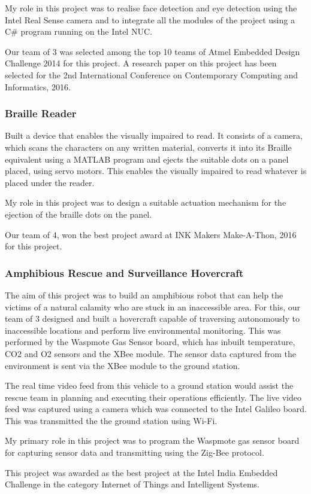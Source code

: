 \documentclass{article}
\begin{document}
My role in this project was to realise face detection and eye detection using the Intel Real Sense camera and to integrate all the modules of the project using a C\# program running on the Intel NUC.

Our team of 3 was selected among the top 10 teams of Atmel Embedded Design Challenge 2014 for this project. A research paper on this project has been selected for the 2nd International Conference on Contemporary Computing and Informatics, 2016.

\subsubsection{Braille Reader}

Built a device that enables the visually impaired to read. It consists of a camera, which scans the characters on any written material, converts it into its Braille equivalent using a MATLAB program and ejects the suitable dots on a panel placed, using servo motors. This enables the visually impaired to read whatever is placed under the reader.

My role in this project was to design a suitable actuation mechanism for the ejection of the braille dots on the panel.

Our team of 4, won the best project award at INK Makers Make-A-Thon, 2016 for this project.

\subsubsection{Amphibious Rescue and Surveillance Hovercraft}

The aim of this project was to build an amphibious robot that can help the victims of a natural calamity who are stuck in an inaccessible area. For this, our team of 3 designed and built a hovercraft capable of traversing autonomously to inaccessible locations and perform live environmental monitoring. This was performed by the Waspmote Gas Sensor board, which has inbuilt temperature, CO2 and O2 sensors and the XBee module. The sensor data captured from the environment is sent via the XBee module to the ground station.

The real time video feed from this vehicle to a ground station would assist the rescue team in planning and executing their operations efficiently. The live video feed was captured using a camera which was connected to the Intel Galileo board. This was transmitted the the ground station using Wi-Fi.

My primary role in this project was to program the Waspmote gas sensor board for capturing sensor data and transmitting using the Zig-Bee protocol.

This project was awarded as the best project at the Intel India Embedded Challenge in the category Internet of Things and Intelligent Systems.
\end{document}
